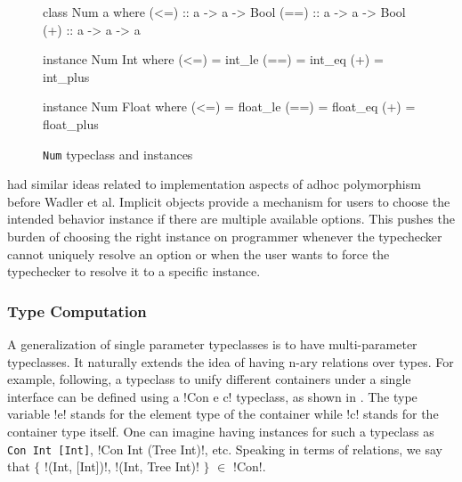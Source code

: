 \documentclass[manuscript,screen,nonacm]{acmart}
\begin{document}

\begin{figure}[ht]
\centering
\begin{minipage}[ht]{0.3\linewidth}
\begin{code}
class Num a where
  (<=) :: a -> a -> Bool
  (==) :: a -> a -> Bool
  (+) :: a -> a -> a
\end{code}
\end{minipage}%
\begin{minipage}[ht]{0.3\linewidth}
\begin{code}
instance Num Int where
  (<=) = int_le
  (==) = int_eq
  (+) = int_plus
\end{code}
\end{minipage}%
\begin{minipage}[ht]{0.3\linewidth}
\begin{code}
instance Num Float where
  (<=) = float_le
  (==) = float_eq
  (+) = float_plus
\end{code}
\end{minipage}
\caption{\lstinline{Num} typeclass and instances}
\label{fig:tc-num}
\end{figure}

\citet{kaes_parametric_1988} had similar ideas related to implementation aspects of adhoc polymorphism before Wadler et al. Implicit objects\cite{oliveira_typeclasses_2010} provide a mechanism for users to choose the intended behavior instance if there are multiple available options. This pushes the burden of choosing the right instance on programmer whenever the typechecker cannot uniquely resolve an option or when the user wants to force the typechecker to resolve it to a specific instance. %

\subsubsection{Type Computation}
A generalization of single parameter typeclasses is to have multi-parameter typeclasses. It naturally extends the idea of having n-ary relations over types. For example, following\cite{jones_tcfd_2000}, a typeclass to unify different containers under a single interface can be defined using a !Con e c! typeclass, as shown in . The type variable !e! stands for the element type of the container while !c! stands for the container type itself. One can imagine having instances for such a typeclass as \lstinline{Con Int [Int]}, !Con Int (Tree Int)!, etc. Speaking in terms of relations, we say that $\{$ !(Int, [Int])!, !(Int, Tree Int)! $\}$ $\in$ !Con!.
\end{document}
